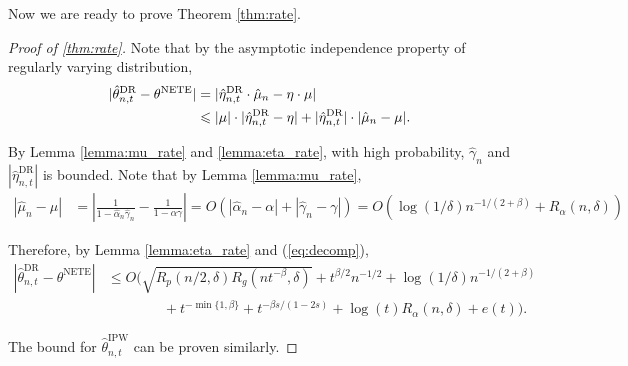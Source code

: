 \documentclass[12pt]{article}
\theoremstyle{plain}
\theoremstyle{definition}
\newcommand{\tmop}[1]{\ensuremath{\operatorname{#1}}}
\begin{document}
Now we are ready to prove Theorem \ref{thm:rate}.
\begin{proof}[Proof of \cref{thm:rate}]
  Note that by the asymptotic independence property of regularly varying
distribution,
\begin{align}
  | \hat{\theta}_{n, t}^{\tmop{DR}} - \theta^{\tmop{NETE}} | & = |
  \hat{\eta}_{n, t}^{\tmop{DR}} \cdot \hat{\mu}_n - \eta \cdot \mu | \notag \\
  & \leqslant | \mu | \cdot | \hat{\eta}_{n, t}^{\tmop{DR}} - \eta | + |
  \hat{\eta}_{n, t}^{\tmop{DR}} | \cdot | \hat{\mu}_n - \mu |. \label{eq:decomp}
\end{align}

By Lemma \ref{lemma:mu_rate} and \ref{lemma:eta_rate}, with high probability, $ \hat{\gamma}_n $ and $| \hat{\eta}_{n,t}^{\tmop{DR}} |$ is bounded. Note that by Lemma \ref{lemma:mu_rate},
\begin{align*}
  | \hat{\mu}_n - \mu | & = \left| \frac{1}{1 - \hat{\alpha}_{n} \hat{\gamma}_n} -
  \frac{1}{1 - \alpha \gamma} \right| = O (| \hat{\alpha}_{n} - \alpha | + |
  \hat{\gamma}_n - \gamma |) = O (\log (1 / \delta) n^{- 1 / (2 + \beta)} +
  R_{\alpha} (n, \delta))
\end{align*}

Therefore, by Lemma \ref{lemma:eta_rate} and (\ref{eq:decomp}),
\begin{align*}
  | \hat{\theta}_{n, t}^{\tmop{DR}} - \theta^{\tmop{NETE}} | & \leqslant O
  ( \sqrt{R_p (n/2, \delta) R_g (nt^{- \beta}, \delta)} + t^{\beta / 2}n^{- 1 / 2} + \log (1 / \delta) n^{- 1 / (2 + \beta)} \\
  &\quad\quad\quad\quad + t^{- \min \{1,\beta\}} + t^{- \beta s / (1 - 2 s)} + \log (t) R_{\alpha} (n, \delta) + e(t)) .
\end{align*}

The bound for $\hat{\theta}_{n, t}^{\tmop{IPW}}$ can be proven similarly.
  \end{proof}
\end{document}
